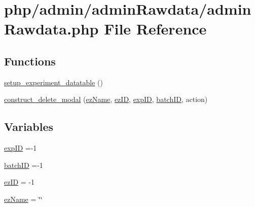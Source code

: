 \hypertarget{admin_rawdata_8php}{\section{php/admin/admin\-Rawdata/admin\-Rawdata.php File Reference}
\label{admin_rawdata_8php}
}
\subsection*{Functions}
\begin{DoxyCompactItemize}
\item 
\hyperlink{admin_rawdata_8php_a3b7fa21c29f2265534745659558aab45}{setup\-\_\-experiment\-\_\-datatable} ()
\item 
\hyperlink{admin_rawdata_8php_aea1f0a5e82147344782bec6246f26663}{construct\-\_\-delete\-\_\-modal} (\hyperlink{admin_rawdata_8php_a052a753c7ee63d24285f81cefddb7d34}{ez\-Name}, \hyperlink{admin_rawdata_8php_adf465cadf95987152966d26567509f92}{ez\-I\-D}, \hyperlink{admin_rawdata_8php_a888d53a6517f4272b5982c3ca9d16e8a}{exp\-I\-D}, \hyperlink{obsolete_2processing__bak_8php_a88c5bc4262b7c34f236357f5c53fc99b}{batch\-I\-D}, action)
\end{DoxyCompactItemize}
\subsection*{Variables}
\begin{DoxyCompactItemize}
\item 
\hyperlink{admin_rawdata_8php_a888d53a6517f4272b5982c3ca9d16e8a}{exp\-I\-D} =-\/1
\item 
\hyperlink{admin_rawdata_8php_a88c5bc4262b7c34f236357f5c53fc99b}{batch\-I\-D} =-\/1
\item 
\hyperlink{admin_rawdata_8php_adf465cadf95987152966d26567509f92}{ez\-I\-D} = -\/1
\item 
\hyperlink{admin_rawdata_8php_a052a753c7ee63d24285f81cefddb7d34}{ez\-Name} = \char`\"{}\char`\"{}
\end{DoxyCompactItemize}



